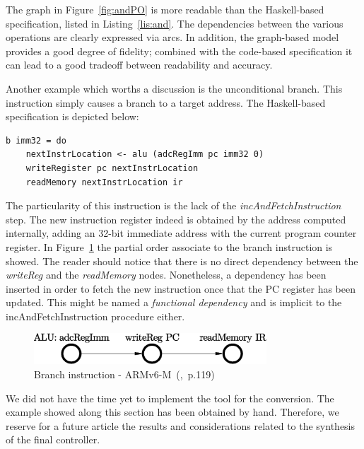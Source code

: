 \documentclass[conference]{IEEEtran}
\begin{document}
The graph in Figure~\ref{fig:andPO} is more readable than the Haskell-based specification,
listed in Listing~\ref{lis:and}. The dependencies between the various operations are
clearly expressed via arcs. In addition, the graph-based model provides a good degree
of fidelity; combined with the code-based specification it can lead to a good tradeoff
between readability and accuracy.

Another example which worths a discussion is the unconditional branch. This
instruction simply causes a branch to a target address. The Haskell-based specification is
depicted below:\\

\begin{lstlisting}[caption=B instruction - Farfalle specification,
frame=single, label=lis:and]
b imm32 = do
    nextInstrLocation <- alu (adcRegImm pc imm32 0)
    writeRegister pc nextInstrLocation
    readMemory nextInstrLocation ir
\end{lstlisting}

\noindent
The particularity of this instruction is the lack of the \textit{incAndFetchInstruction} step.
The new instruction register indeed is obtained by the address computed internally, adding an
32-bit immediate address with the current program counter register. In Figure~\ref{fig:bPO}
the partial order associate to the branch instruction is showed. The reader should notice that
there is no direct dependency between the \textit{writeReg} and the \textit{readMemory}
nodes. Nonetheless, a dependency has been inserted in order to fetch the new instruction once
that the PC register has been updated. This might be named a \textit{functional dependency}
and is implicit to the incAndFetchInstruction procedure either.

\begin{figure}[ht!]
\begin{center}
	\includegraphics[width=8.7cm]{IMG/b.eps}
	\caption{Branch instruction - ARMv6-M~(\cite{armManual},~p.119)}
	\label{fig:bPO}
\end{center}
\end{figure}

We did not have the time yet to implement the tool for the conversion.
The example showed along this section has been obtained by hand. Therefore, we reserve for a
future article the results and considerations related to the synthesis of the final
controller.
\end{document}
